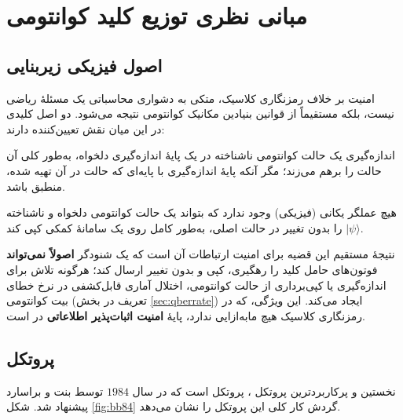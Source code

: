 \chapter{مبانی نظری توزیع کلید کوانتومی}
\label{chap:qkdtheory}

\section{اصول فیزیکی زیربنایی}

امنیت  بر خلاف رمزنگاری کلاسیک، متکی به دشواری محاسباتی یک مسئلهٔ ریاضی نیست، بلکه مستقیماً از قوانین بنیادین مکانیک کوانتومی نتیجه می‌شود. دو اصل کلیدی در این میان نقش تعیین‌کننده دارند:

\begin{definition}
اندازه‌گیری یک حالت کوانتومی ناشناخته در یک پایهٔ اندازه‌گیری دلخواه، به‌طور کلی آن حالت را برهم می‌زند؛ مگر آنکه پایهٔ اندازه‌گیری با پایه‌ای که حالت در آن تهیه شده، منطبق باشد.
\end{definition}

\begin{theorem}
هیچ عملگر یکانی (فیزیکی) وجود ندارد که بتواند یک حالت کوانتومی دلخواه و ناشناخته $\lvert\psi\rangle$ را بدون تغییر در حالت اصلی، به‌طور کامل روی یک سامانهٔ کمکی کپی کند.
\end{theorem}

نتیجهٔ مستقیم این قضیه برای امنیت ارتباطات آن است که یک شنودگر  \textbf{اصولاً نمی‌تواند} فوتون‌های حامل کلید را رهگیری، کپی و بدون تغییر ارسال کند؛ هرگونه تلاش برای اندازه‌گیری یا کپی‌برداری از حالت کوانتومی، اختلال آماری قابل‌کشفی در نرخ خطای بیت کوانتومی (تعریف در بخش \ref{sec:qberrate}) ایجاد می‌کند. این ویژگی، که در رمزنگاری کلاسیک هیچ مابه‌ازایی ندارد، پایهٔ \textbf{امنیت اثبات‌پذیر اطلاعاتی}  در  است.

\section{پروتکل }

نخستین و پرکاربردترین پروتکل ، پروتکل  است که در سال $1984$ توسط بنت و براسارد  پیشنهاد شد. شکل \ref{fig:bb84} گردش کار کلی این پروتکل را نشان می‌دهد.

